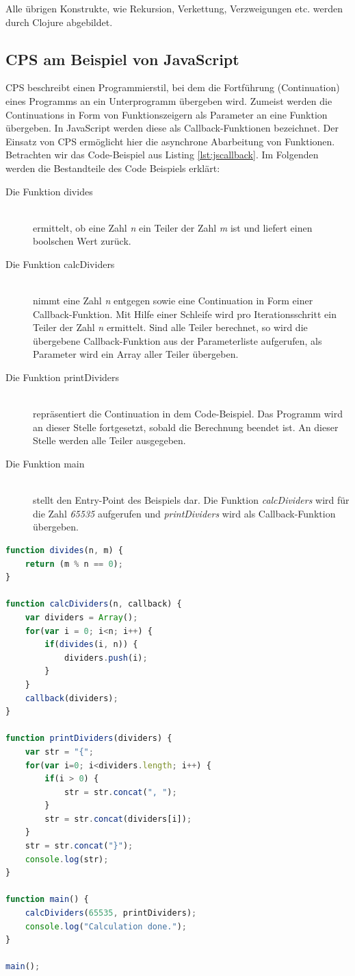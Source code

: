 \documentclass[12pt,a4paper,parskip=half,listof=totoc]{scrreprt}
\begin{document}
Alle übrigen Konstrukte, wie Rekursion, Verkettung, Verzweigungen etc. werden durch Clojure abgebildet.


\subsection{\acl{CPS} am Beispiel von JavaScript}
\label{sec:jscps}\acl{CPS} beschreibt einen Programmierstil, bei dem die Fortführung (Continuation) eines Programms an ein Unterprogramm übergeben wird. Zumeist werden die Continuations in Form von Funktionszeigern als Parameter an eine Funktion übergeben. In JavaScript werden diese als Callback-Funktionen bezeichnet. Der Einsatz von \acs{CPS} ermöglicht hier die asynchrone Abarbeitung von Funktionen. Betrachten wir das Code-Beispiel aus Listing \ref{lst:jscallback}. Im Folgenden werden die Bestandteile des Code Beispiels erklärt:
\begin{description}
\item[Die Funktion divides]\hfill \\
ermittelt, ob eine Zahl \textit{n} ein Teiler der Zahl \textit{m} ist und liefert einen boolschen Wert zurück.
\item[Die Funktion calcDividers]\hfill \\
nimmt eine Zahl \textit{n} entgegen sowie eine Continuation in Form einer Callback-Funktion. Mit Hilfe einer Schleife wird pro Iterationsschritt ein Teiler der Zahl \textit{n} ermittelt. Sind alle Teiler berechnet, so wird die übergebene Callback-Funktion aus der Parameterliste aufgerufen, als Parameter wird ein Array aller Teiler übergeben.
\item[Die Funktion printDividers] \hfill \\
repräsentiert die Continuation in dem Code-Beispiel. Das Programm wird an dieser Stelle fortgesetzt, sobald die Berechnung beendet ist. An dieser Stelle werden alle Teiler ausgegeben.
\item[Die Funktion main]\hfill \\
stellt den Entry-Point des Beispiels dar. Die Funktion \textit{calcDividers} wird für die Zahl \textit{65535} aufgerufen und \textit{printDividers} wird als Callback-Funktion übergeben.\\
\end{description}
\begin{lstlisting}[language=JavaScript,caption=JavaScript Callback Beispiel,label=lst:jscallback]
function divides(n, m) {
	return (m % n == 0);
}

function calcDividers(n, callback) {
	var dividers = Array();
	for(var i = 0; i<n; i++) {
		if(divides(i, n)) {
			dividers.push(i);
		}
	}
	callback(dividers);	
}

function printDividers(dividers) {
	var str = "{";
	for(var i=0; i<dividers.length; i++) {
		if(i > 0) {
			str = str.concat(", ");
		}
		str = str.concat(dividers[i]);
	}
	str = str.concat("}");
	console.log(str);
}

function main() {
	calcDividers(65535, printDividers);
	console.log("Calculation done.");
}

main();
\end{lstlisting}
\end{document}
